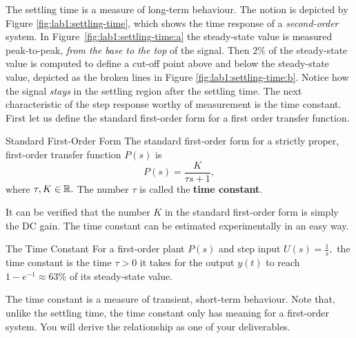 %
The settling time is a measure of long-term behaviour.
The notion is depicted by Figure \ref{fig:lab1:settling-time}, which shows the time response of a \emph{second-order} system.
In Figure~\ref{fig:lab1:settling-time:a} the steady-state value is
measured peak-to-peak, \emph{from the base to the top} of the signal.
Then \(2\%\) of the
steady-state value is computed to define a cut-off point above and below the
steady-state value, depicted as the broken lines in Figure
\ref{fig:lab1:settling-time:b}. Notice how the signal \emph{stays} in the
settling region after the settling time.
The next characteristic of the step response worthy of measurement is the
time constant. First let us define the standard first-order form for a first
order transfer function.
%
\begin{definition}[]{Standard First-Order Form}
  The standard first-order form for a strictly proper, first-order transfer
  function \(P(s)\) is
  \[
    P(s) = \frac{K}{\tau s + 1},
  \]
  where \(\tau, K \in \mathbb{R}.\) The number \(\tau\) is called the \textbf{time
  constant}.
\end{definition}
%
It can be verified that the number \(K\) in the standard first-order form
is simply the DC gain. The time constant can be estimated experimentally
in an easy way.
%
\begin{definition}[]{The Time Constant}
  For a first-order plant \(P(s)\) and step input \(U(s) = \frac{1}{s},\)
  the time constant is the time \(\tau > 0\) it takes for
  the output \(y(t)\) to reach \(1-e^{-1} \approx 63\%\) of its steady-state value.
\end{definition}
%
The time constant is a measure of transient, short-term behaviour. Note that,
unlike the settling time, the time constant only has meaning for a
first-order system. You will derive the relationship as one of your
deliverables.
%

